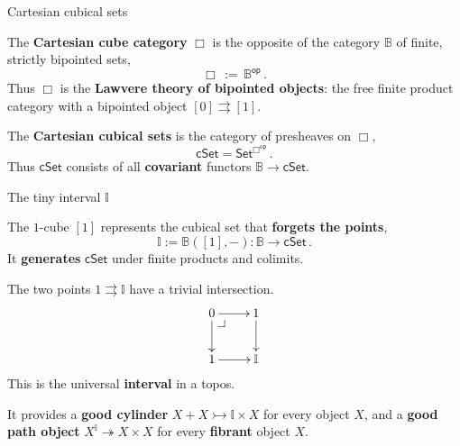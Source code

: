 \documentclass[handout]{beamer}
\makeatletter
\newcommand{\myemph}[1]{\textbf{#1}}    %
\newcommand{\cSet}{\ensuremath{\mathsf{cSet}}}
\newcommand{\pbcorner}[1][dr]{\save*!/#1-1.2pc/#1:(-1,1)@^{|-}\restore}
\newcommand{\ra}{\ensuremath{\rightarrow}}
\newcommand{\II}{\mathbb{I}}
\theoremstyle{remark}
\makeatother
\begin{document}
\begin{frame}{Cartesian cubical sets}

The \myemph{Cartesian cube category} $\Box$ is the opposite of the category $\mathbb{B}$ of finite, strictly bipointed sets,
\[
\Box\, :=\, \mathbb{B}^{\mathsf{op}}\,.
\]  
%
Thus $\Box$ is the \myemph{Lawvere theory of bipointed objects}: the free finite product category with a bipointed object $[0]\rightrightarrows [1]$.  
\pause
\medskip

The \myemph{Cartesian cubical sets} is the category of presheaves on $\Box$,
\[
\mathsf{cSet} = \mathsf{Set}^{\Box^{\mathsf{op}}}\,.
\]
Thus $\mathsf{cSet}$ consists of all \myemph{covariant} functors $\mathbb{B}\ra\mathsf{cSet}$.  
%
\end{frame}
\begin{frame}{The tiny interval $\II$}

The $1$-cube $[1]$ represents the cubical set that \myemph{forgets the points},
\[
\mathbb{I}  := \mathbb{B}([1], -) : \mathbb{B}  \longrightarrow \mathsf{cSet} \,.
\]
It \myemph{generates} $\cSet$ under finite products and colimits. 
\medskip
\pause

The two points $1\rightrightarrows\mathbb{I}$ have a trivial intersection.  
\[
\xymatrix{
0 \ar[d] \ar[r] \pbcorner & 1 \ar[d]  \\
1 \ar[r] & \mathbb{I} 
}
\]
This is the universal \myemph{interval} in a topos.  
\medskip
\pause

It provides a \myemph{good cylinder} $X + X \rightarrowtail  \mathbb{I} \times X$ for every object $X$, 
and a \myemph{good path object} $X^\mathbb{I}  \twoheadrightarrow X\times X$ for every \myemph{fibrant} object $X$.  

\end{frame}
\end{document}
